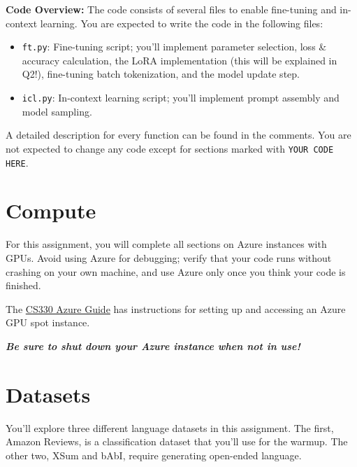 \documentclass[12pt]{article}
\begin{document}
\textbf{Code Overview:} The code consists of several files to enable fine-tuning and in-context learning. You are expected to write the code in the following files:
\begin{itemize}
    \item \texttt{ft.py}: Fine-tuning script; you'll implement parameter selection, loss \& accuracy calculation, the LoRA implementation (this will be explained in Q2!), fine-tuning batch tokenization, and the model update step.
    \item \texttt{icl.py}: In-context learning script; you'll implement prompt assembly and model sampling.
\end{itemize}

A detailed description for every function can be found in the comments. You are not expected to change any code except for sections marked with \texttt{YOUR CODE HERE}.

\section*{Compute}

For this assignment, you will complete all sections on Azure instances with GPUs. Avoid using Azure for debugging; verify that your code runs without crashing on your own machine, and use Azure only once you think your code is finished.

The \href{https://docs.google.com/document/d/10DZEFQA9qAZNMEGcrhsJ6fV_5IshbsCabMco1rKpleg/edit#}{CS330 Azure Guide} has instructions for setting up and accessing an Azure GPU spot instance.

{
\begin{center}
\large
    \textbf{\textit{Be sure to shut down your Azure instance when not in use!}}
\end{center} 
}

\section*{Datasets}

You'll explore three different language datasets in this assignment. The first, Amazon Reviews, is a classification dataset that you'll use for the warmup. The other two, XSum and bAbI, require generating open-ended language.
\end{document}
